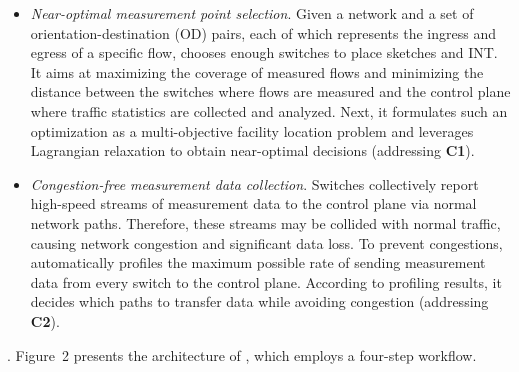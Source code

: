 \begin{itemize}[leftmargin=*]
%
    \item \emph{Near-optimal measurement point selection}. Given a network and a set of orientation-destination (OD) pairs, each of which represents the ingress and egress of a specific flow, \sysname chooses enough switches to place sketches and INT. It aims at maximizing the coverage of measured flows and minimizing the distance between the switches where flows are measured and the control plane where traffic statistics are collected and analyzed. Next, it formulates such an optimization as a multi-objective facility location problem and leverages Lagrangian relaxation to obtain near-optimal decisions (addressing \textbf{C1}). 
%
%
    \item \emph{Congestion-free measurement data collection}. Switches collectively report high-speed streams of measurement data to the control plane via normal network paths. Therefore, these streams may be collided with normal traffic, causing network congestion and significant data loss. To prevent congestions, \sysname automatically profiles the maximum possible rate of sending measurement data from every switch to the control plane. According to profiling results, it decides which paths to transfer data while avoiding congestion (addressing \textbf{C2}). 
%
\end{itemize}

. Figure~2 presents the architecture of \sysname, which employs a four-step workflow. 

